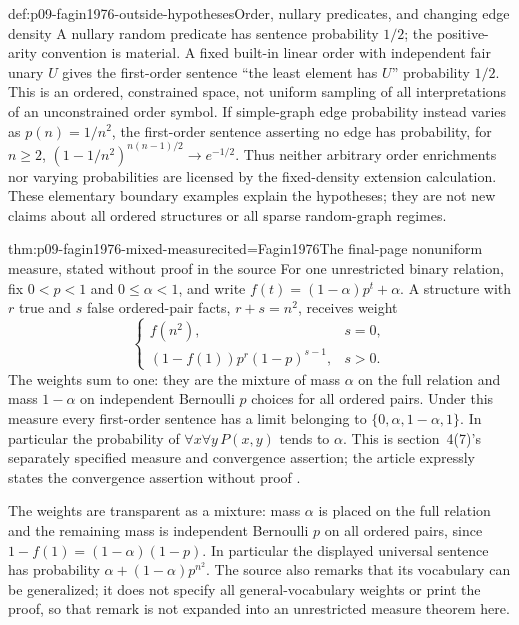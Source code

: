 \begin{hbwarning}{def:p09-fagin1976-outside-hypotheses}{Order, nullary predicates, and changing edge density}
A nullary random predicate has sentence probability \(1/2\); the
positive-arity convention is material.  A fixed built-in linear order
with independent fair unary \(U\) gives the first-order sentence
``the least element has \(U\)'' probability \(1/2\).  This is an
ordered, constrained space, not uniform sampling of all interpretations
of an unconstrained order symbol.  If simple-graph edge probability
instead varies as \(p(n)=1/n^2\), the first-order sentence asserting no
edge has probability, for \(n\geq2\),
\((1-1/n^2)^{n(n-1)/2}\to e^{-1/2}\).
Thus neither arbitrary order enrichments nor varying probabilities are
licensed by the fixed-density extension calculation.  These elementary
boundary examples explain the hypotheses; they are not new claims about
all ordered structures or all sparse random-graph regimes.
\end{hbwarning}

\begin{hbtheorem}{thm:p09-fagin1976-mixed-measure}{cited=Fagin1976}{The final-page nonuniform measure, stated without proof in the source}
For one unrestricted binary relation, fix \(0<p<1\) and
\(0\leq\alpha<1\), and write \(f(t)=(1-\alpha)p^t+\alpha\).
A structure with \(r\) true and \(s\) false ordered-pair facts,
\(r+s=n^2\), receives weight
\[
 \begin{cases}
  f(n^2),&s=0,\\
  (1-f(1))p^r(1-p)^{s-1},&s>0.
 \end{cases}
\]
The weights sum to one: they are the mixture of mass \(\alpha\) on
the full relation and mass \(1-\alpha\) on independent Bernoulli
\(p\) choices for all ordered pairs.  Under this measure every
first-order sentence has a limit belonging to
\(\{0,\alpha,1-\alpha,1\}\).  In particular the probability of
\(\forall x\forall y\,P(x,y)\) tends to \(\alpha\).
This is section~4(7)'s separately specified measure and convergence
assertion; the article expressly states the convergence assertion without
proof \cite[p.~58]{Fagin1976}.
\end{hbtheorem}

The weights are transparent as a mixture: mass \(\alpha\) is placed
on the full relation and the remaining mass is independent Bernoulli
\(p\) on all ordered pairs, since
\(1-f(1)=(1-\alpha)(1-p)\).  In particular the displayed universal
sentence has probability \(\alpha+(1-\alpha)p^{n^2}\).
The source also remarks that its vocabulary can be generalized; it does
not specify all general-vocabulary weights or print the proof, so that
remark is not expanded into an unrestricted measure theorem here.


